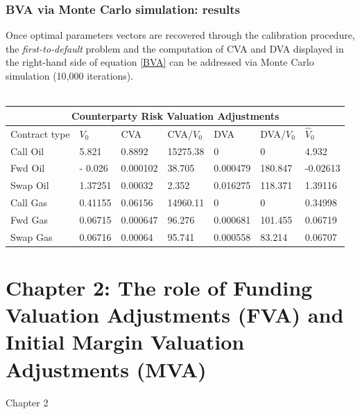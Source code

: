 \documentclass{beamer}
\begin{document}
\begin{frame}
\frametitle{BVA via Monte Carlo simulation: results }

	Once optimal parameters vectors are recovered through the calibration procedure, the \emph{first-to-default} problem and the computation of CVA and DVA displayed in the right-hand side of equation \ref{BVA} can be addressed via Monte Carlo simulation (10,000 iterations). \\~\\

	\footnotesize{
	\begin{tabular}{ |p{1.9 cm}||p{1 cm}|p{1.3 cm}|p{1.2cm}|p{1.2 cm}|p{1.3cm}|p{1.2 cm}| }
	 \hline
	 \multicolumn{7}{|c|}{\textbf{Counterparty Risk Valuation Adjustments }} \\
 	\hline
	Contract type & $V_{0}$ & CVA  &CVA/$V_{0}$& DVA & DVA/$V_{0}$ &$\hat{V}_{0}$\\
	 \hline

 
	Call Oil &5.821 & 0.8892 &15275.38 &0 &0 &4.932\\
	Fwd Oil &- 0.026 &0.000102 &38.705 &0.000479 &180.847 &-0.02613\\
	Swap Oil &1.37251 &0.00032 &2.352 &0.016275 &118.371 &1.39116\\

	Call Gas &0.41155 &0.06156 &14960.11 &0 &0&0.34998\\
	Fwd Gas &0.06715 &0.000647 &96.276 & 0.000681 &101.455& 0.06719 \\
	Swap Gas &0.06716 &0.00064 &95.741 &0.000558 &83.214 & 0.06707 \\
    
 	\hline

	\end{tabular}
	}

\end{frame}

\section{Chapter 2: The role of Funding Valuation Adjustments (FVA) and Initial Margin Valuation Adjustments (MVA)}

\begin{frame}
\Huge{\centerline{Chapter 2}}
\end{frame}
\end{document}
